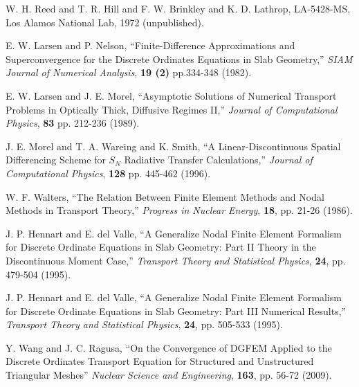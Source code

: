 \documentclass[final,3p,times]{elsarticle}
\begin{document}
\setlength{\baselineskip}{12pt}
\begin{thebibliography}{300}

 W. H. Reed and T. R. Hill and F. W. Brinkley and K. D. Lathrop, LA-5428-MS, Los Alamos National Lab, 1972 (unpublished).

 E. W. Larsen and P. Nelson, ``Finite-Difference Approximations and Superconvergence for the Discrete Ordinates Equations in Slab Geometry,'' {\it SIAM Journal of Numerical Analysis}, {\bf 19 (2)} pp.334-348 (1982).

 E. W. Larsen and J. E. Morel, ``Asymptotic Solutions of Numerical Transport Problems in Optically Thick, Diffusive Regimes II,'' {\it Journal of Computational Physics}, {\bf 83} pp. 212-236 (1989).

 J. E. Morel and T. A. Wareing and K. Smith, ``A Linear-Discontinuous Spatial Differencing Scheme for $S_N$ Radiative Transfer Calculations,'' {\it Journal of Computational Physics}, {\bf 128} pp. 445-462 (1996).

 W. F. Walters, ``The Relation Between Finite Element Methods and Nodal Methods in Transport Theory,'' {\it Progress in Nuclear Energy}, {\bf 18}, pp. 21-26 (1986).

 J. P. Hennart and E. del Valle, ``A Generalize Nodal Finite Element Formalism for Discrete Ordinate Equations in Slab Geometry: Part II Theory in the Discontinuous Moment Case,'' {\it Transport Theory and Statistical Physics}, {\bf 24}, pp. 479-504 (1995).

 J. P. Hennart and E. del Valle, ``A Generalize Nodal Finite Element Formalism for Discrete Ordinate Equations in Slab Geometry: Part III Numerical Results,'' {\it Transport Theory and Statistical Physics}, {\bf 24}, pp. 505-533 (1995).

 Y. Wang and J. C. Ragusa, ``On the Convergence of DGFEM Applied to the Discrete Ordinates Transport Equation for Structured and Unstructured Triangular Meshes'' {\it Nuclear Science and Engineering}, {\bf 163}, pp. 56-72 (2009).


\end{thebibliography}
\end{document}
